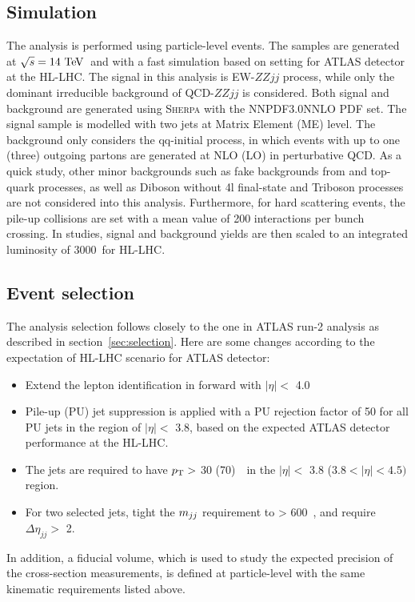 \subsection{Simulation}

The analysis is performed using particle-level events.
The samples are generated at $\sqrt{s} = 14~\text{Te\kern -0.1em V}$~and with a fast simulation based on setting for ATLAS detector at the HL-LHC.
The signal in this analysis is EW-$ZZjj$ process, while only the dominant irreducible background of QCD-$ZZjj$ is considered.
Both signal and background are generated using \textsc{Sherpa} with the NNPDF3.0NNLO PDF set.
The signal sample is modelled with two jets at Matrix Element (ME) level.
The background only considers the qq-initial process, in which events with up to one (three) outgoing partons are generated at NLO (LO) in perturbative QCD.
As a quick study, other minor backgrounds such as fake backgrounds from \Zjet and top-quark processes, as well as Diboson without 4l final-state and Triboson processes are not considered into this analysis.
Furthermore, for hard scattering events, the pile-up collisions are set with a mean value of 200 interactions per bunch crossing.
In studies, signal and background yields are then scaled to an integrated luminosity of 3000~\ifb for HL-LHC.

\subsection{Event selection}

The analysis selection follows closely to the one in ATLAS run-2 analysis as described in section~\ref{sec:selection}.
Here are some changes according to the expectation of HL-LHC scenario for ATLAS detector:
\begin{itemize}
	\item Extend the lepton identification in forward with $|\eta| <$ 4.0
	\item Pile-up (PU) jet suppression is applied with a PU rejection factor of 50 for all PU jets in the region of $|\eta| <$ 3.8, based on the expected ATLAS detector performance at the HL-LHC.
	\item The jets are required to have $p_{\text{T}} >$ 30 (70)~\gev~in the $|\eta| <$ 3.8 ($3.8 < |\eta| < 4.5)$ region.
	\item For two selected jets, tight the $m_{jj}$ requirement to > 600~\gev, and require $\Delta \eta_{jj} >$ 2.
\end{itemize}
In addition, a fiducial volume, which is used to study the expected precision of the cross-section measurements,
 is defined at particle-level with the same kinematic requirements listed above.

